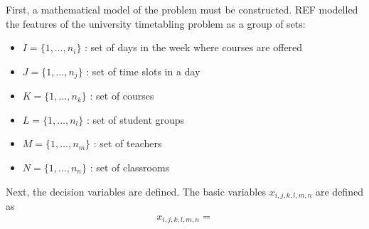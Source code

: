 \documentclass[a4paper, 12pt]{report}
\begin{document}
First, a mathematical model of the problem must be constructed. REF modelled 
the features of the university timetabling problem as a group of sets:
\begin{itemize}
	\item
		\begin{math}
			I = \{1, \dots , n_i\}
		\end{math}
		: set of days in the week where courses are offered
	\item
		\begin{math}
			J = \{1, \dots , n_j\}
		\end{math}
		: set of time slots in a day
	\item 
		\begin{math}
			K = \{1, \dots , n_k\}
		\end{math}
		: set of courses
	\item 
		\begin{math}
			L = \{1, \dots , n_l\}
		\end{math}
		: set of student groups
	\item 
		\begin{math}
			M = \{1, \dots , n_m\}
		\end{math}
		: set of teachers
	\item 
		\begin{math}
			N = \{1, \dots , n_n\}
		\end{math}
		: set of classrooms
\end{itemize}

Next, the decision variables are defined. The basic variables
\begin{math}
	x_{i,j,k,l,m,n}
\end{math}
are defined as
\begin{align}
	x_{i,j,k,l,m,n} = 
\end{align}


\renewcommand\bibname{References}
%

%
\end{document}
